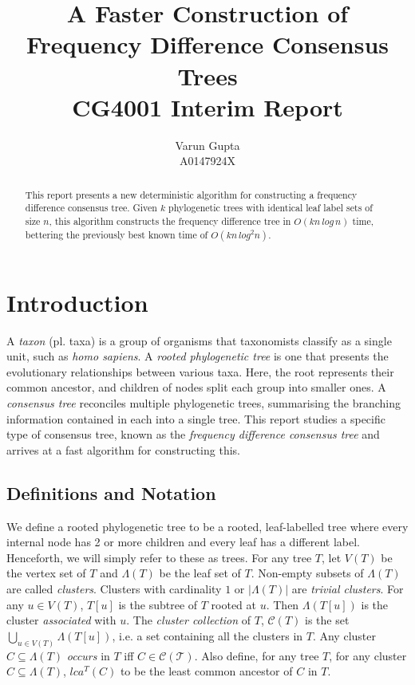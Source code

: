 \documentclass{article}
\title{A Faster Construction of Frequency Difference Consensus Trees\\CG4001 Interim Report}
\author{Varun Gupta\\A0147924X}
\newcommand{\leafset}{\Lambda}
\begin{document}
    \maketitle

    \begin{abstract}
        This report presents a new deterministic algorithm for constructing a frequency difference consensus tree. Given $k$ phylogenetic trees with identical leaf label sets of size $n$, this algorithm constructs the frequency difference tree in $O(kn\,log\,n)$ time, bettering the previously best known time of $O(kn\,log^2n)$.
    \end{abstract}

    \section{Introduction}
    \label{sec:introduction}

    A \textit{taxon} (pl. taxa) is a group of organisms that taxonomists classify as a single unit, such as \textit{homo sapiens}. A \textit{rooted phylogenetic tree} is one that presents the evolutionary relationships between various taxa. Here, the root represents their common ancestor, and children of nodes split each group into smaller ones. A \textit{consensus tree} reconciles multiple phylogenetic trees, summarising the branching information contained in each into a single tree. This report studies a specific type of consensus tree, known as the \textit{frequency difference consensus tree} and arrives at a fast algorithm for constructing this.

    \subsection{Definitions and Notation}
    We define a rooted phylogenetic tree to be a rooted, leaf-labelled tree where every internal node has 2 or more children and every leaf has a different label. Henceforth, we will simply refer to these as trees. For any tree $T$, let $V(T)$ be the vertex set of $T$ and $\leafset(T)$ be the leaf set of $T$. Non-empty subsets of $\leafset(T)$ are called \textit{clusters}. Clusters with cardinality $1$ or $|\leafset(T)|$ are \textit{trivial clusters}. For any $u \in V(T)$, $T[u]$ is the subtree of $T$ rooted at $u$. Then $\leafset(T[u])$ is the cluster \textit{associated} with $u$. The \textit{cluster collection} of $T$, $\mathcal{C}(T)$ is the set $\bigcup_{u \in V(T)} {\leafset(T[u])}$, i.e. a set containing all the clusters in $T$. Any cluster $C \subseteq \leafset(T)$ \textit{occurs} in $T$ iff $C \in \mathcal{C(T)}$. Also define, for any tree $T$, for any cluster $C \subseteq \leafset(T)$, $lca^T(C)$ to be the least common ancestor of $C$ in $T$.\\
\end{document}
